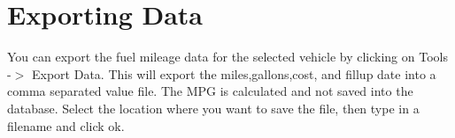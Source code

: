\chapter{Exporting Data}
You can export the fuel mileage data for the selected vehicle by clicking on 
Tools -$>$ Export Data.  This will export the miles,gallons,cost, and fillup date into
a comma separated value file.  The MPG is calculated and not saved into the database.
Select the location where you want to save the file, then type in a filename and click ok.
 
